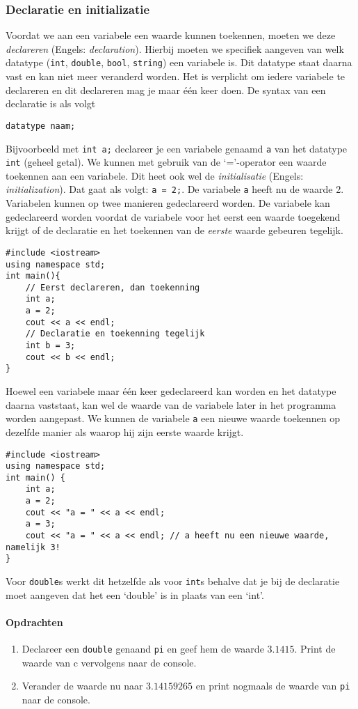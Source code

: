 \documentclass[12pt,a4paper]{article}
\newcommand{\icode}{\lstinline}
\begin{document}
\subsubsection{Declaratie en initializatie}
Voordat we aan een variabele een waarde kunnen toekennen, moeten we deze \emph{declareren} (Engels: \emph{declaration}). 
Hierbij moeten we specifiek aangeven van welk datatype (\icode{int}, \icode{double}, \icode{bool}, 
\icode{string}) een variabele is. Dit datatype staat daarna vast en kan niet meer veranderd worden.
Het is verplicht om iedere variabele te declareren en dit declareren mag je maar één keer doen. 
De syntax van een declaratie is als volgt

\icode{datatype naam;} 

Bijvoorbeeld met \icode{int a;} declareer je een variabele genaamd \icode{a} van het datatype 
\icode{int} (geheel getal). We kunnen met gebruik van de `='-operator een waarde toekennen aan 
een variabele. Dit heet ook wel de \emph{initialisatie} (Engels: \emph{initialization}).
Dat gaat als volgt: \icode{a = 2;}. De variabele \icode{a} heeft nu de waarde 2.
Variabelen kunnen op twee manieren gedeclareerd worden. De variabele kan gedeclareerd worden 
voordat de variabele voor het eerst een waarde toegekend krijgt of de declaratie en het toekennen 
van de \emph{eerste} waarde gebeuren tegelijk. 
\begin{lstlisting}
#include <iostream> 
using namespace std; 
int main(){
	// Eerst declareren, dan toekenning 
	int a; 
	a = 2; 
	cout << a << endl; 
	// Declaratie en toekenning tegelijk
	int b = 3; 
	cout << b << endl; 
}
\end{lstlisting}
Hoewel een variabele maar één keer gedeclareerd kan worden en het datatype daarna vaststaat, kan 
wel de waarde van de variabele later in het programma worden aangepast. We kunnen de variabele 
\icode{a} een nieuwe waarde toekennen op dezelfde manier als waarop hij zijn eerste waarde krijgt. 
\begin{lstlisting}
#include <iostream> 
using namespace std;
int main() {
	int a; 
	a = 2; 
	cout << "a = " << a << endl; 
	a = 3; 
	cout << "a = " << a << endl; // a heeft nu een nieuwe waarde, namelijk 3! 
}
\end{lstlisting}
Voor \icode{double}s werkt dit hetzelfde als voor \icode{int}s behalve dat je bij de declaratie moet 
aangeven dat het een ‘double’ is in plaats van een ‘int’. 
\paragraph{Opdrachten}
\begin{enumerate} 
\item 
	Declareer een \icode{double} genaand \icode{pi} en geef hem de waarde $3.1415$. 
Print de waarde van c vervolgens naar de console. 
\item 
	Verander de waarde nu naar $3.14159265$ en print
nogmaals de waarde van \icode{pi} naar de console. 
\end{enumerate} 
\end{document}
